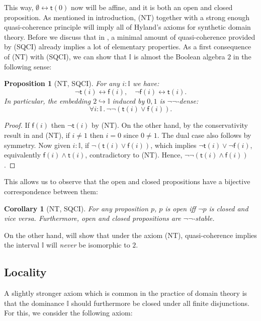 \documentclass[a4paper,12pt]{amsart}
\newtheorem{corollary}[theorem]{Corollary}
\newtheorem{proposition}[theorem]{Proposition}
\theoremstyle{definition}
\newcommand{\mbb}[1]{\mathbb{#1}}
\newcommand{\I}{\mbb I}
\newcommand{\ms}[1]{\mathsf{#1}}
\newcommand{\hook}{\hookrightarrow}
\newcommand{\dneg}{\neg\neg}
\newcommand{\fa}[2]{\forall #1\!\colon\!\!#2\mathpunct{.}}
\newcommand{\emp}{\emptyset}
\newcommand{\eq}{\leftrightarrow}
\newcommand\istsym{\ms{t}}
\newcommand\isfsym{\ms{f}}
\newcommand\ist[1]{\istsym(#1)}
\newcommand\isf[1]{\isfsym(#1)}
\begin{document}
This way, $\emp \eq \ist{0}$ now will be affine, and it is both an open and closed proposition. As mentioned in introduction, (NT) together with a strong enough quasi-coherence principle will imply all of Hyland's axioms for synthetic domain theory. Before we discuss that in , a minimal amount of quasi-coherence provided by (SQCI) already implies a lot of elementary properties. As a first consequence of (NT) with (SQCI), we can show that $\I$ is almost the Boolean algebra $2$ in the following sense:

\begin{proposition}[NT, SQCI]\label{prop:filed}
  For any $i : \I$ we have:
  \[ \neg \ist{i} \eq \isf{i}, \quad \neg\isf{i} \eq \ist{i}\text{.} \]
  In particular, the embedding $2 \hook \I$ induced by $0,1$ is $\neg\neg$-dense:
  \[ \fa i\I \dneg(\ist{i} \vee \isf{i})\text{.} \]
\end{proposition}
\begin{proof}
  If $\isf{i}$ then $\neg\ist{i}$ by (NT). On the other hand, by the conservativity result in  and (NT), if $i \neq 1$ then $i = 0$ since $0 \neq 1$. The dual case also follows by symmetry. Now given $i :\I$, if $\neg(\ist{i} \vee \isf{i})$, which implies $\neg\ist{i} \vee \neg\isf{i}$, equivalently $\isf{i} \wedge \ist{i}$, contradictory to (NT). Hence, $\neg\neg(\ist{i} \wedge \isf{i})$.
\end{proof}

This allows us to observe that the open and closed propositions have a bijective correspondence between them:

\begin{corollary}[NT, SQCI]\label{cor:opendnegclose}
  For any proposition $p$, $p$ is open iff $\neg p$ is closed and vice versa. Furthermore, open and closed propositions are $\dneg$-stable.
\end{corollary}

On the other hand,  will show that under the axiom (NT), quasi-coherence implies the interval $\I$ will \emph{never} be isomorphic to $2$. 

\subsection{Locality}

A slightly stronger axiom which is common in the practice of domain theory is that the dominance $\I$ should furthermore be closed under all finite disjunctions. For this, we consider the following axiom:
\end{document}
